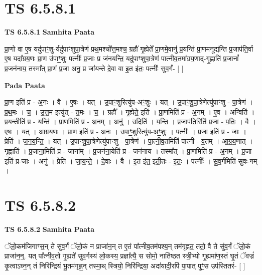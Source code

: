 \documentclass[17pt]{extarticle}
\begin{document}
\section*{ TS 6.5.8.1 }

\textbf{TS 6.5.8.1 } \newline
\textbf{Samhita Paata} \newline

प्रा॒णो वा ए॒ष यदु॑पाꣳ॒॒शु-र्यदु॑पाꣳशुपा॒त्रेण॑ प्रथ॒मश्चो᳚त्त॒मश्च॒ ग्रहौ॑ गृ॒ह्येते᳚ प्रा॒णमे॒वानु॑ प्र॒यन्ति॑ प्रा॒णमनूद्य॑न्ति प्र॒जाप॑ति॒र्वा ए॒ष यदा᳚ग्रय॒णः प्रा॒ण उ॑पाꣳ॒॒शुः पत्नीः᳚ प्र॒जाः प्र ज॑नयन्ति॒ यदु॑पाꣳशुपा॒त्रेण॑ पात्नीव॒तमा᳚ग्रय॒णाद्-गृ॒ह्णाति॑ प्र॒जानां᳚ प्र॒जन॑नाय॒ तस्मा᳚त् प्रा॒णं प्र॒जा अनु॒ प्र जा॑यन्ते दे॒वा वा इ॒त इ॑तः॒ पत्नीः᳚ सुव॒र्गं- [  ] \newline

\textbf{Pada Paata} \newline

प्रा॒ण इति॑ प्र - अ॒नः । वै । ए॒षः । यत् । उ॒पाꣳ॒॒शुरित्यु॑प-अꣳ॒॒शुः । यत् । उ॒पाꣳ॒॒शु॒पा॒त्रेणेत्यु॑पाꣳशु - पा॒त्रेण॑ । प्र॒थ॒मः । च॒ । उ॒त्त॒म इत्यु॑त् - त॒मः । च॒ । ग्रहौ᳚ । गृ॒ह्येते॒ इति॑ । प्रा॒णमिति॑ प्र - अ॒नम् । ए॒व । अन्विति॑ । प्र॒यन्तीति॑ प्र - यन्ति॑ । प्रा॒णमिति॑ प्र - अ॒नम् । अनु॑ । उदिति॑ । य॒न्ति॒ । प्र॒जाप॑ति॒रिति॑ प्र॒जा - प॒तिः॒ । वै । ए॒षः । यत् । आ॒ग्र॒य॒णः । प्रा॒ण इति॑ प्र - अ॒नः । उ॒पाꣳ॒॒शुरित्यु॑प-अꣳ॒॒शुः । पत्नीः᳚ । प्र॒जा इति॑ प्र - जाः । प्रेति॑ । ज॒न॒य॒न्ति॒ । यत् । उ॒पाꣳ॒॒शु॒पा॒त्रेणेत्यु॑पाꣳशु - पा॒त्रेण॑ । पा॒त्नी॒व॒तमिति॑ पात्नी - व॒तम् । आ॒ग्र॒य॒णात् । गृ॒ह्णाति॑ । प्र॒जाना॒मिति॑ प्र - जाना᳚म् । प्र॒जन॑ना॒येति॑ प्र - जन॑नाय । तस्मा᳚त् । प्रा॒णमिति॑ प्र - अ॒नम् । प्र॒जा इति॑ प्र-जाः । अनु॑ । प्रेति॑ । जा॒य॒न्ते॒ । दे॒वाः । वै । इ॒त इ॑त॒ इती॒तः - इ॒तः॒ । पत्नीः᳚ । सु॒व॒र्गमिति॑ सुवः-गम् ।  \newline




\section*{ TS 6.5.8.2 }

\textbf{TS 6.5.8.2 } \newline
\textbf{Samhita Paata} \newline

ॅलो॒कम॑जिगाꣳस॒न् ते सु॑व॒र्गं ॅलो॒कं न प्राजा॑न॒न् त ए॒तं पा᳚त्नीव॒तम॑पश्य॒न् तम॑गृह्णत॒ ततो॒ वै ते सु॑व॒र्गं ॅलो॒कं प्राजा॑न॒न्॒. यत् पा᳚त्नीव॒तो गृ॒ह्यते॑ सुव॒र्गस्य॑ लो॒कस्य॒ प्रज्ञा᳚त्यै॒ स सोमो॒ नाति॑ष्ठत स्त्री॒भ्यो गृ॒ह्यमा॑ण॒स्तं घृ॒तं ॅवज्रं॑ कृ॒त्वाऽघ्न॒न् तं निरि॑न्द्रियं भू॒तम॑गृह्ण॒न् तस्मा॒थ् स्त्रियो॒ निरि॑न्द्रिया॒ अदा॑यादी॒रपि॑ पा॒पात् पुꣳ॒॒स उप॑स्तितरं- [  ] \newline
\end{document}
